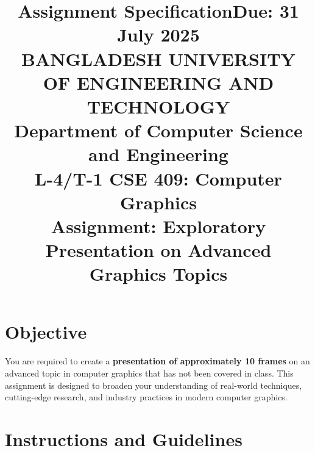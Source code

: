 \documentclass[10pt,answers]{exam}
\title{
  \vspace{-1em}
  \normalsize Assignment Specification\hfill {Due: 31 July 2025}\\
  \vspace{.4cm}
  \large BANGLADESH UNIVERSITY OF ENGINEERING AND TECHNOLOGY\\
  \vspace{.1cm}
  Department of Computer Science and Engineering\\
  \vspace{.2cm}
  L-4/T-1 \hspace{.1cm} CSE 409: Computer Graphics\\
  \vspace{.2cm}
  \textbf{Assignment: Exploratory Presentation on Advanced Graphics Topics}
}
\author{}
\date{}
\begin{document}
\maketitle
\thispagestyle{empty}

\vspace*{-2cm}
\section*{Objective}
You are required to create a \textbf{presentation of approximately 10 frames} on an advanced topic in computer graphics that has not been covered in class. This assignment is designed to broaden your understanding of real-world techniques, cutting-edge research, and industry practices in modern computer graphics.

\section*{Instructions and Guidelines}
\end{document}
